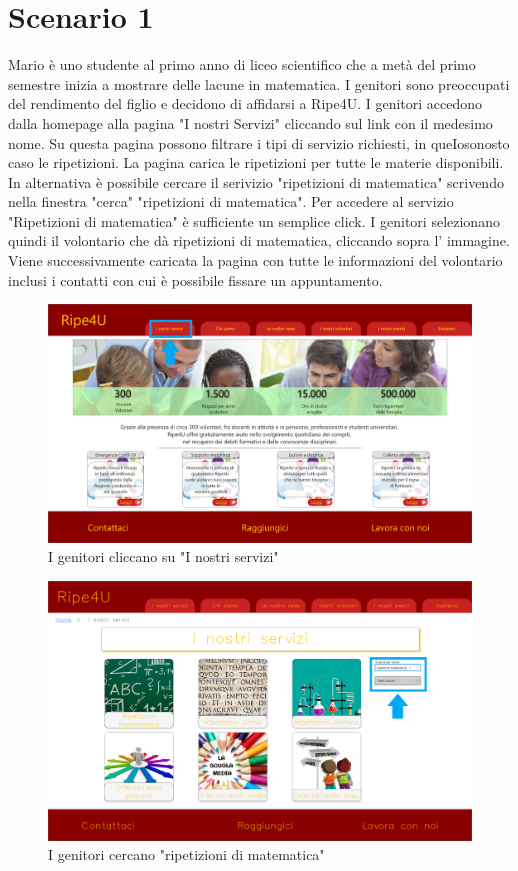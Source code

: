 
    \section{Scenario 1}
    Mario è uno studente al primo anno di liceo scientifico che a metà del primo
    semestre inizia a mostrare delle lacune in matematica. I genitori sono
    preoccupati del rendimento del figlio e decidono di affidarsi a Ripe4U. I
    genitori accedono dalla homepage alla pagina "I nostri Servizi" cliccando
    sul link con il medesimo nome. Su questa pagina possono filtrare i tipi di
    servizio richiesti, in queIosonosto caso le ripetizioni. La pagina carica le
    ripetizioni per tutte le materie disponibili. In alternativa è possibile
    cercare il serivizio "ripetizioni di matematica" scrivendo nella finestra
    "cerca" "ripetizioni di matematica". Per accedere al servizio "Ripetizioni
    di matematica" è sufficiente un semplice click. I genitori selezionano
    quindi il volontario che dà ripetizioni di matematica, cliccando sopra l'
    immagine. Viene successivamente caricata la pagina con tutte le informazioni
    del volontario inclusi i contatti con cui è possibile fissare un
    appuntamento.
    \begin{figure}[H]
        \centering
        \includegraphics[scale=0.3]{resources/images/scenario1-1.png}
        \caption{I genitori cliccano su "I nostri servizi"}
    \end{figure}
    \begin{figure}[H]
        \centering
        \includegraphics[scale=0.3]{resources/images/scenario1-2.png}
        \caption{I genitori cercano "ripetizioni di matematica"}
    \end{figure}

